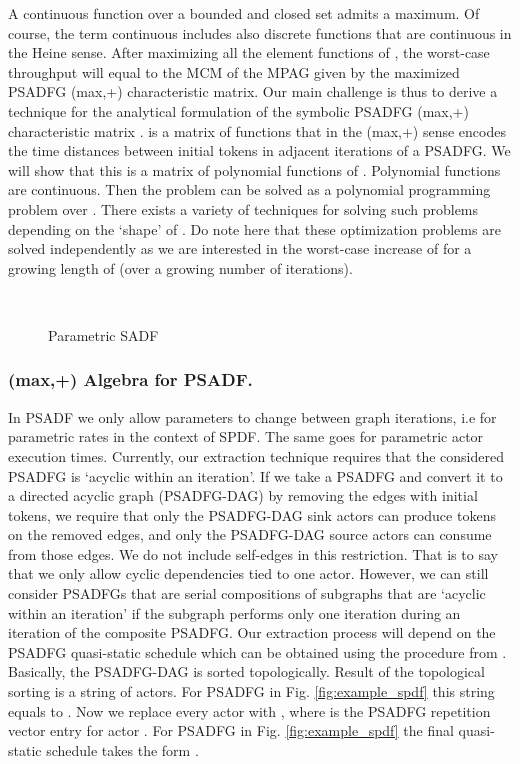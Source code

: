 \documentclass[]{eptcs}
\begin{document}
A continuous function over a bounded and closed set admits a maximum. Of course, the term continuous includes also discrete functions that are continuous in the Heine sense. After maximizing all the element functions of , the worst-case throughput will equal to the MCM of the MPAG given by the maximized PSADFG (max,+) characteristic matrix. Our main challenge is thus to derive a technique for the analytical formulation of the symbolic PSADFG (max,+) characteristic matrix .  is a matrix of functions that in the (max,+) sense encodes the time distances between initial tokens in adjacent iterations of a PSADFG. We will show that this is a matrix of polynomial functions of . Polynomial functions are continuous. Then the problem can be solved as a polynomial programming problem over . There exists a variety of techniques for solving such problems depending on the `shape' of . Do note here that these optimization problems are solved independently as we are interested in the worst-case increase of  for a growing length of  (over a growing number of iterations).
\begin{figure}[t]\centering
	~~~~~~~~~~~~~~~
	\caption{Parametric SADF}\label{fig:psadf}\end{figure}
\subsubsection{(max,+) Algebra for PSADF.}
In PSADF we only allow parameters to change between graph iterations, i.e  for parametric rates in the context of SPDF. The same goes for parametric actor execution times. Currently, our  extraction technique requires that the considered PSADFG is `acyclic within an iteration'. If we take a PSADFG and convert it to a directed acyclic graph (PSADFG-DAG) by removing the edges with initial tokens, we require that only the PSADFG-DAG sink actors can produce tokens on the removed edges, and only the PSADFG-DAG source actors can consume from those edges. We do not include self-edges in this restriction. That is to say that we only allow cyclic dependencies tied to one actor. However, we can still consider PSADFGs that are serial compositions of subgraphs that are `acyclic within an iteration' if the subgraph performs only one iteration during an iteration of the composite PSADFG. Our  extraction process will depend on the PSADFG quasi-static schedule which can be obtained using the procedure from \cite{2frad:all}. Basically, the PSADFG-DAG is sorted topologically. Result of the topological sorting is a string of actors. For PSADFG in Fig. \ref{fig:example_spdf} this string equals to . Now we replace every actor  with , where  is the PSADFG repetition vector entry for actor . For PSADFG in Fig. \ref{fig:example_spdf} the final quasi-static schedule takes the form .
\end{document}
